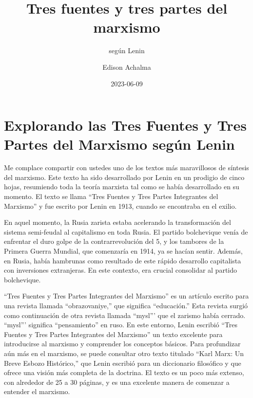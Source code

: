 \documentclass[
  a4paper,
]{article}
\title{Tres fuentes y tres partes del marxismo}
\subtitle{según Lenin}
\author{Edison Achalma}
\date{2023-06-09}
\begin{document}
\maketitle
\ifdefined\Shaded\renewenvironment{Shaded}{\begin{tcolorbox}[frame hidden, sharp corners, interior hidden, boxrule=0pt, enhanced, borderline west={3pt}{0pt}{shadecolor}, breakable]}{\end{tcolorbox}}\fi

\hypertarget{explorando-las-tres-fuentes-y-tres-partes-del-marxismo-seguxfan-lenin}{%
\section{Explorando las Tres Fuentes y Tres Partes del Marxismo según
Lenin}\label{explorando-las-tres-fuentes-y-tres-partes-del-marxismo-seguxfan-lenin}}

Me complace compartir con ustedes uno de los textos más maravillosos de
síntesis del marxismo. Este texto ha sido desarrollado por Lenin en un
prodigio de cinco hojas, resumiendo toda la teoría marxista tal como se
había desarrollado en su momento. El texto se llama ``Tres Fuentes y
Tres Partes Integrantes del Marxismo'' y fue escrito por Lenin en 1913,
cuando se encontraba en el exilio.

En aquel momento, la Rusia zarista estaba acelerando la transformación
del sistema semi-feudal al capitalismo en toda Rusia. El partido
bolchevique venía de enfrentar el duro golpe de la contrarrevolución del
5, y los tambores de la Primera Guerra Mundial, que comenzaría en 1914,
ya se hacían sentir. Además, en Rusia, había hambrunas como resultado de
este rápido desarrollo capitalista con inversiones extranjeras. En este
contexto, era crucial consolidar al partido bolchevique.

``Tres Fuentes y Tres Partes Integrantes del Marxismo'' es un artículo
escrito para una revista llamada ``obrazovaniye,'' que significa
``educación.'' Esta revista surgió como continuación de otra revista
llamada ``mysl''' que el zarismo había cerrado. ``mysl''' significa
``pensamiento'' en ruso. En este entorno, Lenin escribió ``Tres Fuentes
y Tres Partes Integrantes del Marxismo'' un texto excelente para
introducirse al marxismo y comprender los conceptos básicos. Para
profundizar aún más en el marxismo, se puede consultar otro texto
titulado ``Karl Marx: Un Breve Esbozo Histórico,'' que Lenin escribió
para un diccionario filosófico y que ofrece una visión más completa de
la doctrina. El texto es un poco más extenso, con alrededor de 25 a 30
páginas, y es una excelente manera de comenzar a entender el marxismo.
\end{document}
